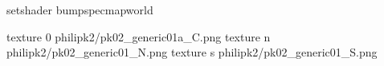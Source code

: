 setshader bumpspecmapworld

texture 0 philipk2/pk02_generic01a_C.png
texture n philipk2/pk02_generic01_N.png
texture s philipk2/pk02_generic01_S.png

